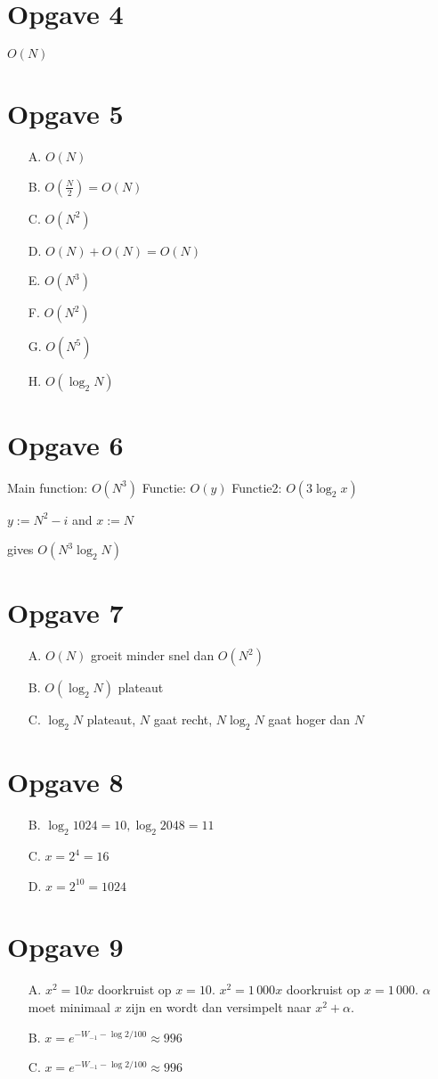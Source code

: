 \documentclass[12pt,a4paper]{article}
\begin{document}
\section{Opgave 4}
$O(N)$

\section{Opgave 5}
\begin{itemize}
\item[A.] $O(N)$
\item[B.] $O(\frac{N}{2}) = O(N)$
\item[C.] $O(N^2)$
\item[D.] $O(N) + O(N) = O(N)$
\item[E.] $O(N^3)$
\item[F.] $O(N^2)$
\item[G.] $O(N^5)$
\item[H.] $O(\log_2{N})$

\end{itemize}
\section{Opgave 6}
Main function: $O(N^3)$
Functie: $O(y)$
Functie2: $O(3\log_2{x})$

$y := N^2 - i$
and $x := N$

gives $O(N^3 \log_2{N})$

\section{Opgave 7}
\begin{itemize}
\item[A.] $O(N)$ groeit minder snel dan $O(N^2)$
\item[B.] $O(\log_2{N})$ plateaut
\item[C.] $\log_2{N}$ plateaut, $N$ gaat recht, $N\log_2{N}$ gaat hoger dan $N$  

\end{itemize}
\section{Opgave 8}
\begin{itemize}
\item[B.] $\log_2{1024} = 10, \log_2{2048} = 11$
\item[C.] $x = 2^4 = 16$
\item[D.] $x = 2^{10} = 1024$ 

\end{itemize}
\section{Opgave 9}
\begin{itemize}
\item[A.] $x^2 = 10x$ doorkruist op $x = 10$. $x^2 = 1\,000x$ doorkruist op $x = 1\,000$. $\alpha$ moet minimaal $x$ zijn en wordt dan versimpelt naar $x^2+\alpha$.
\item[B.] $x = e^{-W_{-1}-\log{2}/100} \approx 996$
\item[C.] $x = e^{-W_{-1}-\log{2}/100} \approx 996$
\end{itemize}
\end{document}
